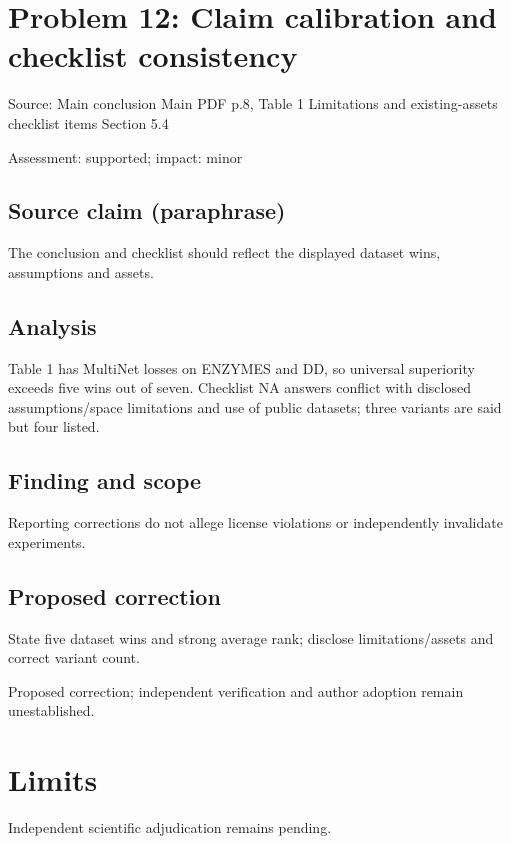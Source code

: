 \documentclass[11pt]{article}
\begin{document}
\section*{Problem 12: Claim calibration and checklist consistency}

Source: Main conclusion Main PDF p.8, Table 1 Limitations and existing-assets checklist items Section 5.4

Assessment: supported; impact: minor

\subsection*{Source claim (paraphrase)}

The conclusion and checklist should reflect the displayed dataset wins, assumptions and assets.

\subsection*{Analysis}

Table 1 has MultiNet losses on ENZYMES and DD, so universal superiority exceeds five wins out of seven. Checklist NA answers conflict with disclosed assumptions/space limitations and use of public datasets; three variants are said but four listed.

\subsection*{Finding and scope}

Reporting corrections do not allege license violations or independently invalidate experiments.

\subsection*{Proposed correction}

State five dataset wins and strong average rank; disclose limitations/assets and correct variant count.

Proposed correction; independent verification and author adoption remain unestablished.

\section*{Limits}

Independent scientific adjudication remains pending.\par
\end{document}

